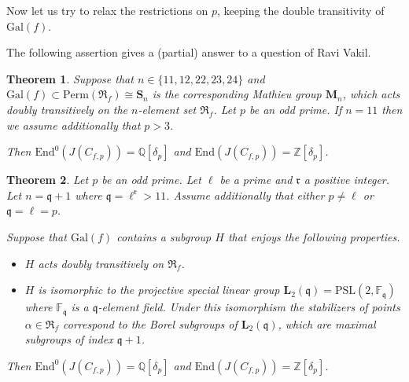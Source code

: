 \documentclass[12pt,a4paper,reqno]{amsart}
\def\Q{{\mathbb Q}}
\def\Z{{\mathbb Z}}
\def\R{{\mathbb R}}
\def\F{{\mathbb F}}
\def\R{{\mathfrak R}}
\def\Gal{\mathrm{Gal}}
\def\End{\mathrm{End}}
\newtheorem{thm}{Theorem}[section]
\theoremstyle{definition}
\newtheorem{rem}[thm]{Remark}
\begin{document}
 Now let us try to relax the restrictions on $p$, keeping the double transitivity of $\Gal(f)$.
 
 The following assertion gives a (partial) answer to a question of Ravi Vakil.
 
 
 \begin{thm}
 \label{mathieu}
 Suppose that $n \in \{11,12,22,23,24\}$  and $\Gal(f)\subset \mathrm{Perm}(\R_f) \cong \mathbf{S}_n$
 is the corresponding Mathieu group $\mathbf{M}_n$, which acts doubly transitively on  the $n$-element set $\R_f$.
 Let $p$ be an odd prime. If $n=11$ then we assume additionally that $p>3$.
 
 Then $\End^0(J(C_{f,p}))=\Q[\delta_p]$ and $\End(J(C_{f,p}))=\Z[\delta_p]$.
\end{thm}
 
  
   \begin{thm}
 \label{PSL2}
 Let $p$ be an odd prime. Let $\ell$ be a prime and $\mathfrak{r}$ a positive integer.
 Let $n=\mathfrak{q}+1$ where $\mathfrak{q}=\ell^{\mathfrak{r}}>11$.
Assume additionally that either $p \ne \ell$ or $\mathfrak{q}=\ell=p$.
 
 Suppose that $\Gal(f)$ contains a subgroup $H$ that enjoys the following properties.
 
 \begin{itemize}
 \item
 $H$ acts doubly transitively on $\R_f$.
 \item
 $H$ is isomorphic to the projective special linear group $\mathbf{L}_2(\mathfrak{q})=\mathrm{PSL}(2,\F_{\mathfrak{q}})$ where $\F_{\mathfrak{q}}$ is a $\mathfrak{q}$-element field.
 Under this isomorphism the stabilizers of points $\alpha \in \R_f$ correspond to the  Borel subgroups of $\mathbf{L}_2(\mathfrak{q})$, which are maximal subgroups of index $\mathfrak{q}+1$.
 \end{itemize}
 Then $\End^0(J(C_{f,p}))=\Q[\delta_p]$ and $\End(J(C_{f,p}))=\Z[\delta_p]$.
\end{thm}
 
\end{document}
